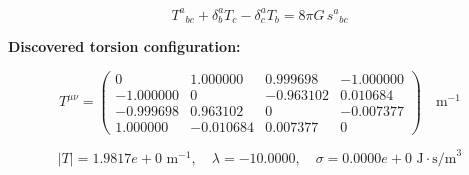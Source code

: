 
\begin{equation}
  T^a{}_{bc} + \delta^a_b T_c - \delta^a_c T_b = 8\pi G \, s^a{}_{bc}
\end{equation}

\textbf{Discovered torsion configuration:}

\begin{equation}
  T^{\mu\nu} = \begin{pmatrix}
    0 & 1.000000 & 0.999698 & -1.000000 \\
    -1.000000 & 0 & -0.963102 & 0.010684 \\
    -0.999698 & 0.963102 & 0 & -0.007377 \\
    1.000000 & -0.010684 & 0.007377 & 0
  \end{pmatrix} \quad \text{m}^{-1}
\end{equation}

\begin{equation}
  |T| = 1.9817e+0 \text{ m}^{-1}, \quad
  \lambda = -10.0000, \quad
  \sigma = 0.0000e+0 \text{ J}\cdot\text{s/m}^3
\end{equation}